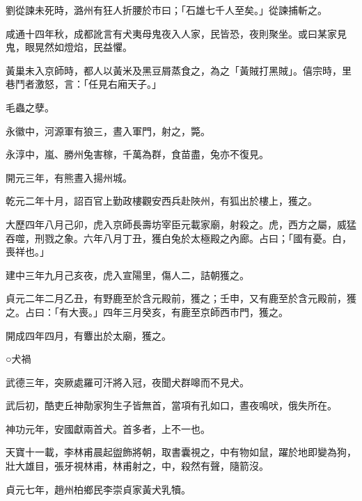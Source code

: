 \begin{pinyinscope}
 劉從諫未死時，潞州有狂人折腰於市曰；「石雄七千人至矣。」從諫捕斬之。



 咸通十四年秋，成都訛言有犬夷母鬼夜入人家，民皆恐，夜則聚坐。或曰某家見鬼，眼晃然如燈焰，民益懼。



 黃巢未入京師時，都人以黃米及黑豆屑蒸食之，為之「黃賊打黑賊」。僖宗時，里巷鬥者激怒，言：「任見右廂天子。」



 毛蟲之孽。



 永徽中，河源軍有狼三，晝入軍門，射之，斃。



 永淳中，嵐、勝州兔害稼，千萬為群，食苗盡，兔亦不復見。



 開元三年，有熊晝入揚州城。



 乾元二年十月，詔百官上勤政樓觀安西兵赴陜州，有狐出於樓上，獲之。



 大歷四年八月己卯，虎入京師長壽坊宰臣元載家廟，射殺之。虎，西方之屬，威猛吞噬，刑戮之象。六年八月丁丑，獲白兔於太極殿之內廊。占曰；「國有憂。白，喪祥也。」



 建中三年九月己亥夜，虎入宣陽里，傷人二，詰朝獲之。



 貞元二年二月乙丑，有野鹿至於含元殿前，獲之；壬申，又有鹿至於含元殿前，獲之。占曰：「有大喪。」四年三月癸亥，有鹿至京師西市門，獲之。



 開成四年四月，有麞出於太廟，獲之。



 ○犬禍



 武德三年，突厥處羅可汗將入冠，夜聞犬群嗥而不見犬。



 武后初，酷吏丘神勣家狗生子皆無首，當項有孔如口，晝夜鳴吠，俄失所在。



 神功元年，安國獻兩首犬。首多者，上不一也。



 天寶十一載，李林甫晨起盥飾將朝，取書囊視之，中有物如鼠，躍於地即變為狗，壯大雄目，張牙視林甫，林甫射之，中，殺然有聲，隨箭沒。



 貞元七年，趙州柏鄉民李崇貞家黃犬乳犢。




\end{pinyinscope}
